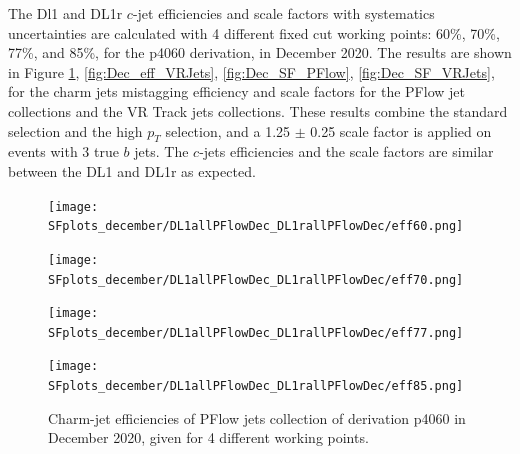 \documentclass[letterpaper,12pt]{article}
\begin{document}
The Dl1 and DL1r $c$-jet efficiencies and scale factors with systematics uncertainties are calculated with 4 different fixed cut working points: 60\%, 70\%, 77\%, and 85\%, for the p4060 derivation, in December 2020. The results are shown in Figure \ref{fig:Dec_eff_PFlow}, \ref{fig:Dec_eff_VRJets}, \ref{fig:Dec_SF_PFlow}, \ref{fig:Dec_SF_VRJets}, for the charm jets mistagging efficiency and scale factors for the PFlow jet collections and the VR Track jets collections. These results combine the standard selection and the high $p_T$ selection, and a 1.25 $\pm$ 0.25 scale factor is applied on events with 3 true $b$ jets. The $c$-jets efficiencies and the scale factors are similar between the DL1 and DL1r as expected. 




\begin{figure}[H]
\begin{minipage}[b]{.45\textwidth}
\centering
\texttt{[image: SFplots\_december/DL1allPFlowDec\_DL1rallPFlowDec/eff60.png]}
\end{minipage}\hfill
\begin{minipage}[b]{.45\textwidth}
\centering
\texttt{[image: SFplots\_december/DL1allPFlowDec\_DL1rallPFlowDec/eff70.png]}
\end{minipage}\hfill
\begin{minipage}[b]{.45\textwidth}
\centering
\texttt{[image: SFplots\_december/DL1allPFlowDec\_DL1rallPFlowDec/eff77.png]}
\end{minipage}\hfill
\begin{minipage}[b]{.45\textwidth}
\centering
\texttt{[image: SFplots\_december/DL1allPFlowDec\_DL1rallPFlowDec/eff85.png]}
\end{minipage}
\caption{Charm-jet efficiencies of PFlow jets collection of derivation p4060 in December 2020, given for 4 different working points.} \label{fig:Dec_eff_PFlow}
\end{figure}
\end{document}

